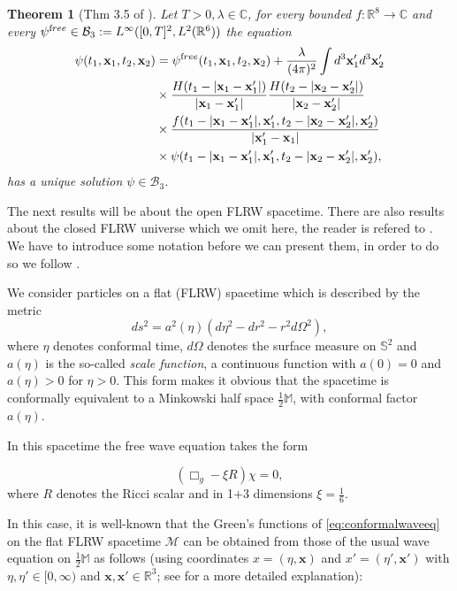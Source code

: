 \documentclass[b5paper,draft,openbib,12pt]{memoir}
\newtheorem{Thm}[Def]{Theorem}
\newcommand{\R}{\mathbb{R}}
\newcommand{\M}{\mathbb{M}}
\newcommand{\vx}{\mathbf{x}}
\newcommand{\free}{{\textup free}}
\begin{document}
\begin{Thm}[Thm 3.5 of \cite{mtve}]
  Let \(T>0, \lambda\in\mathbb{C}\), for every 
  bounded \(f:\mathbb{R}^8\rightarrow \mathbb{C}\) 
  and every \(\psi^\free \in \mathcal{B}_3:=L^\infty([0,T]^2,L^2(\mathbb{R}^6))\) the equation
\begin{align*}
\psi(t_1,\vx_1,t_2,\vx_2)&=\psi^\free(t_1,\vx_1,t_2,\vx_2) + \frac{\lambda}{(4\pi)^2}\int d^3\vx_1'd^3\vx_2'\\
& \times \frac{H(t_1-|\vx_1-\vx_1'|)}{|\vx_1-\vx_1'|} \frac{H(t_2-|\vx_2-\vx_2'|)}{|\vx_2-\vx_2'|}\\
&\times  \frac{f(t_1-|\vx_1-\vx_1'|,\vx_1',t_2-|\vx_2-\vx_2'|,\vx_2')}{|\vx_1'-\vx_1|}\\
& \times \psi(t_1-|\vx_1-\vx_1'|,\vx_1',t_2-|\vx_2-\vx_2'|,\vx_2'),
\end{align*}
has a unique solution \(\psi\in\mathcal{B}_3\).
\end{Thm}


The next results will be about the open FLRW spacetime.
There are also results about the closed
FLRW universe which we omit here, the reader is refered
to \cite[Thm 4.3]{lienertcurved}.
We have to introduce some notation before we can 
present them, in order to do so we follow \cite[sec 3.3]{selfKG}. 


We consider particles on a flat (FLRW) spacetime which is 
described by the metric
\begin{equation}
	ds^2 = a^2(\eta) \left( d\eta^2 - dr^2 - r^2 d \Omega^2 \right),
\end{equation}
where $\eta$ denotes conformal time, $d \Omega$ denotes the 
surface measure on $\mathbb{S}^2$ and $a(\eta)$ is the so-called 
\textit{scale function}, a continuous function with $a(0) = 0$ 
and $a(\eta) > 0$ for $\eta >0$. This form makes it obvious that 
the spacetime is conformally equivalent to a Minkowski half 
space $\tfrac{1}{2}\M$, with conformal factor $a(\eta)$.

In this spacetime the free wave equation takes the form 

\begin{equation}
	\left( \Box_g - \xi R \right) \chi = 0,
	\label{eq:conformalwaveeq}
\end{equation}
where $R$ denotes the Ricci scalar and in 1+3 dimensions $\xi = \frac{1}{6}$.

In this case, it is well-known that the Green's 
functions of \eqref{eq:conformalwaveeq} on the flat 
FLRW spacetime $\mathcal{M}$ can be obtained from those of the 
usual wave equation on $\tfrac{1}{2}\M$ as follows (using 
coordinates $x=(\eta,\vx)$ and $x'=(\eta',\vx')$ with 
$\eta,\eta' \in [0,\infty)$ and $\vx,\vx' \in \R^3$; see 
\cite{lienertcurved} for a more detailed explanation):
\end{document}
